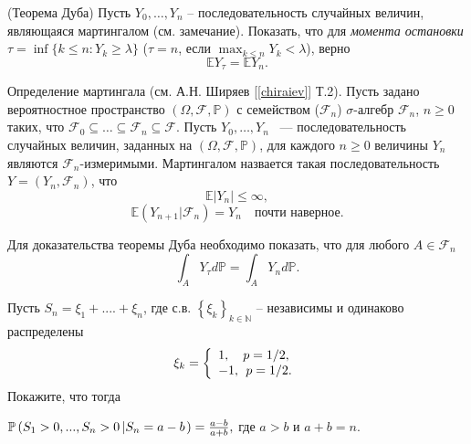 \begin{problem}\Star(Теорема Дуба)
\label{sec:doob}
Пусть $Y_0,\dots,Y_n$ -- последовательность случайных величин, являющаяся мартингалом (см. замечание).
Показать, что для  \textit{момента остановки}
$\tau = \inf \{k\leq n: Y_k\geq \lambda \}$  ($\tau = n$, если $\max_{k\leq n}Y_k <\lambda$), верно
\begin{equation*}
\mathbb{E}{Y_{\tau}} = \mathbb{E}Y_n.
\end{equation*}
\end{problem}
\begin{remark}
Определение мартингала (см. А.Н. Ширяев [\ref{chiraiev}] Т.2). Пусть задано вероятностное пространство $(\Omega,\mathcal{F},\mathbb{P})$  с семейством ($\mathcal{F}_n$) $\sigma$-алгебр $\mathcal{F}_n$, $n\geq 0$ таких, что $\mathcal{F}_0\subseteq\dots\subseteq\mathcal{F}_n\subseteq \mathcal{F}$. 
Пусть $Y_0,\dots,Y_n$ ~--- последовательность случайных величин, заданных на $(\Omega,\mathcal{F},\mathbb{P})$, для каждого $n\geq 0 $ величины $Y_n$ являются $\mathcal{F}_n$-измеримыми. Мартингалом назвается  такая  последовательность $Y = (Y_n,\mathcal{F}_n)$, что 
\begin{equation*}
\mathbb{E}|Y_n|\leq\infty,
\end{equation*}
\begin{equation*}
\mathbb{E}(Y_{n+1}|\mathcal{F}_n)=Y_n \quad \text{почти наверное}.
\end{equation*}

Для доказательства теоремы Дуба необходимо показать, что 
 для любого $A\in \mathcal{F}_n$ 
\begin{equation*}
\int_{A} Y_{\tau} d\mathbb{P} = \int_{A}Y_{n}d\mathbb{P}.
\end{equation*}
\end{remark}

\begin{problem}
Пусть $S_n =\xi _1 +....+\xi _n $, где с.в. $\left\{ {\xi _k } \right\}_{k\in {\mathbb N}} $ -- 
независимы и одинаково распределены \[\xi _k =\left\{ {\begin{array}{l}
 1,\quad p=1 \mathord{\left/ {\vphantom {1 2}} \right. 
\kern-\nulldelimiterspace} 2, \\ 
 -1,\;\,p=1 \mathord{\left/ {\vphantom {1 2}} \right. 
\kern-\nulldelimiterspace} 2. \\ 
 \end{array}} \right.\] Покажите, что тогда

$\mathrm{{\mathbb P}}\left( {S_1 >0,...,S_n >0\left| {S_n =a-b} \right.} 
\right)=\frac{a-b}{a+b},$ где $a>b$ и $a+b=n$.
\end{problem}

